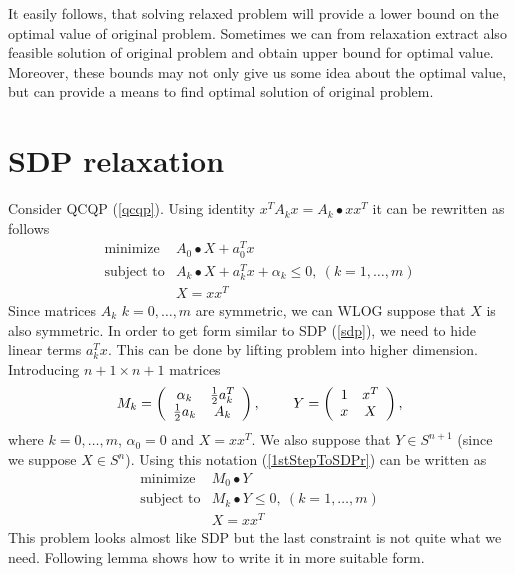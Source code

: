 \documentclass[10pt,oneside]{book}
\theoremstyle{definition}
\begin{document}

It easily follows, that solving relaxed problem will provide a lower bound on the optimal value of original problem. Sometimes we can from relaxation extract also feasible solution of original problem and obtain upper bound for optimal value. Moreover, these bounds may not only give us some idea about the optimal value, but can provide a means to find optimal solution of original problem. 

\section{SDP relaxation}
Consider QCQP (\ref{qcqp}). Using identity $x^TA_kx = A_k\bullet xx^T$ it can be rewritten as follows
\begin{equation} 
\label{1stStepToSDPr}
\begin{array}{ll}
\mbox{minimize}& A_0\bullet X + a_0^Tx \\
\mbox{subject to}& A_k\bullet X+ a_k^Tx + \alpha_k \leq 0, \  (k = 1,\dots ,m)\\
& X = xx^T
\end{array} 
\end{equation}
Since matrices $A_k$ $k=0,\dots, m$ are symmetric, we can WLOG suppose that $X$ is also symmetric. In order to get form similar to SDP (\ref{sdp}), we need to hide linear terms $a_k^Tx$. This can be done by lifting problem into higher dimension. Introducing $n+1\times n+1$ matrices
$$M_k = \left(
\begin{array}{cc}
\alpha_k & {1\over 2}a_k^T \\
{1\over 2}a_k & A_k
\end{array}\right), 
\ \ \ \ \ \ \
Y =  \left(
\begin{array}{cc}
1 & x^T \\
x & X
\end{array}\right), 
$$
where $k=0,\dots ,m$, $\alpha_0=0$ and $X=xx^T$. We also suppose that $Y\in S^{n+1}$ (since we suppose $X\in S^n$).  Using this notation (\ref{1stStepToSDPr}) can be written as
\begin{equation} 
\label{2ndStepToSDPr}
\begin{array}{ll}
\mbox{minimize}& M_0\bullet Y \\
\mbox{subject to}& M_k\bullet Y \leq 0, \  (k = 1,\dots ,m)\\
& X = xx^T
\end{array} 
\end{equation}
This problem looks almost like SDP but the last constraint is not quite what we need. Following lemma shows how to write it in more suitable form.
\end{document}
